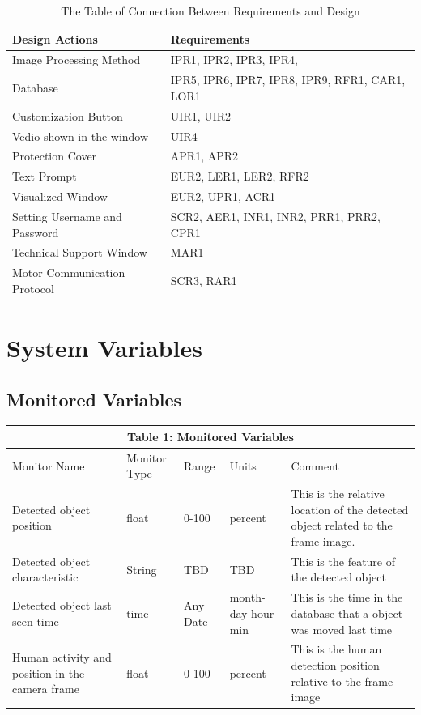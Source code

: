 \documentclass[12pt, titlepage]{article}
\begin{document}
\begin{table}[H]
\begin{center}
\caption {The Table of Connection Between Requirements and Design}
    \begin{tabular}{| p{8cm}| p{7cm} |}
    \hline
    \textbf{Design Actions} & \textbf{Requirements}  \\
    \hline
    Image Processing Method & IPR1, IPR2, IPR3, IPR4,  \\
    \hline
    Database  & IPR5, IPR6, IPR7, IPR8, IPR9, RFR1, CAR1, LOR1\\
    \hline
    Customization Button & UIR1, UIR2\\
    \hline
    Vedio shown in the window & UIR4\\
    \hline
    Protection Cover & APR1, APR2 \\
    \hline
    Text Prompt & EUR2, LER1, LER2, RFR2\\
    \hline
    Visualized Window & EUR2, UPR1, ACR1\\
    \hline
    Setting Username and Password & SCR2, AER1, INR1, INR2, PRR1, PRR2, CPR1\\
    \hline
    Technical Support Window & MAR1\\
    \hline
    Motor Communication Protocol & SCR3, RAR1\\
    \hline
    \end{tabular}
\end{center}
\end{table}

\section{System Variables}


\subsection{Monitored Variables}
\begin{tabular}{|p{}|p{}|p{}|p{}|p{}|}

\hline \multicolumn{5}{|c|}{Table 1: Monitored Variables}\\

\hline Monitor Name&Monitor Type&Range&Units &Comment\\
\hline Detected object position&float&0-100&percent&This is the relative location of the detected object related to the frame image.\\
\hline Detected object characteristic&String&TBD&TBD&This is the feature of the detected object\\
\hline Detected object last seen time&time&Any Date&month-day-hour-min&This is the time in the database that a object was moved last time\\
\hline Human activity and position in the camera frame&float&0-100&percent&This is the human detection position relative to the frame image\\



\hline

\end{tabular}
\end{document}
